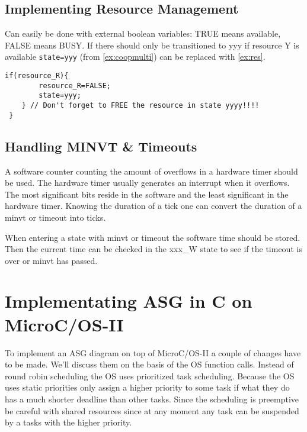 \documentclass[../main.tex]{subfiles}
\begin{document}
\subsection{Implementing Resource Management}
Can easily be done with external boolean variables: TRUE means available, FALSE means BUSY.
If there should only be transitioned to yyy if resource Y is available \lstinline{state=yyy} (from \ref{ex:coopmulti}) can be replaced with \ref{ex:res}.

\begin{lstlisting}[caption=Example of implementing resource management., label=ex:res]
	if(resource_R){
		resource_R=FALSE;
		state=yyy;
	} // Don't forget to FREE the resource in state yyyy!!!!
 }
\end{lstlisting}
\subsection{Handling MINVT \& Timeouts}
A software counter counting the amount of overflows in a hardware timer should be used.
The hardware timer usually generates an interrupt when it overflows. 
The most significant bits reside in the software and the least significant in the hardware timer.
Knowing the duration of a tick one can convert the duration of a minvt or timeout into ticks.

When entering a state with minvt or timeout the software time should be stored.
Then the current time can be checked in the xxx\_W state to see if the timeout is over or minvt has passed.


\section{Implementating ASG in C on MicroC/OS-II}

To implement an ASG diagram on top of MicroC/OS-II a couple of changes have to be made.
We'll discuss them on the basis of the OS function calls.
Instead of round robin scheduling the OS uses prioritized task scheduling. 
Because the OS uses static priorities only assign a higher priority to some task if what they do has a much shorter deadline than other tasks.
Since the scheduling is preemptive be careful with shared resources since at any moment any task can be suspended by a tasks with the higher priority. 
\end{document}
